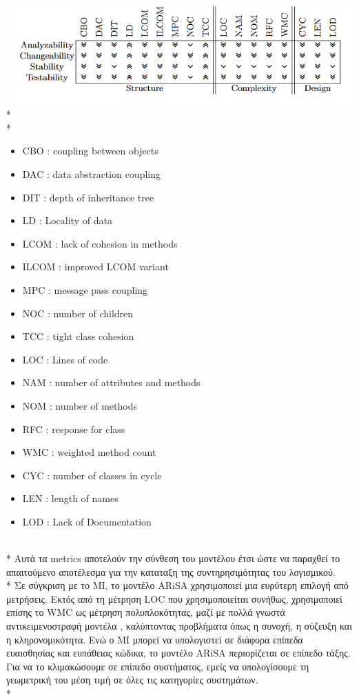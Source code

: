 \documentclass[a4paper, 11pt]{article}
\begin{document}
{{\includegraphics{images/arisa compendium.png}\\*
\\*
\begin{itemize}
\item \textlatin{CBO : coupling between objects}
\item \textlatin{DAC : data abstraction coupling}
\item \textlatin{DIT : depth of inheritance tree} 
\item \textlatin{LD  : Locality of data} 
\item \textlatin{LCOM : lack of cohesion in methods}
\item \textlatin{ILCOM : improved LCOM variant}
\item \textlatin{MPC : message pass coupling}
\item \textlatin{NOC : number of children} 
\item \textlatin{TCC : tight class cohesion}
\item \textlatin{LOC : Lines of code}
\item \textlatin{NAM : number of attributes and methods}
\item \textlatin{NOM : number of methods}
\item \textlatin{RFC : response for class}
\item \textlatin{WMC : weighted method count}
\item \textlatin{CYC : number of classes in cycle}
\item \textlatin{LEN : length of names}
\item \textlatin{LOD : Lack of Documentation}
\end{itemize}
\\*
Αυτά τα metrics αποτελούν την σύνθεση του μοντέλου έτσι ώστε να παραχθεί το απαιτούμενο αποτέλεσμα για την καταταξη της συντηρησιμότητας του λογισμικού.
\\*
Σε σύγκριση με το MI, το μοντέλο \textlatin{ARiSA} χρησιμοποιεί μια ευρύτερη επιλογή από 
μετρήσεις. Εκτός από τη μέτρηση \textlatin{LOC} που χρησιμοποιείται συνήθως, χρησιμοποιεί επίσης το WMC
ως μέτρηση πολυπλοκότητας, μαζί με πολλά γνωστά αντικειμενοστραφή μοντέλα ,
καλύπτοντας προβλήματα όπως η συνοχή, η σύζευξη και η κληρονομικότητα.
Ενώ ο MI μπορεί να υπολογιστεί σε διάφορα επίπεδα ευαισθησίας και ευπάθειας κώδικα,  το
μοντέλο \textlatin{ARiSA} περιορίζεται σε επίπεδο τάξης. Για να το κλιμακώσουμε σε επίπεδο συστήματος, εμείς
να υπολογίσουμε τη γεωμετρική του μέση τιμή σε όλες τις κατηγορίες συστημάτων.
\\*


}}
\end{document}
